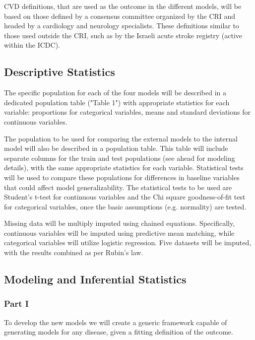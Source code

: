 \documentclass[a4paper,12pt]{article}
\begin{document}
	CVD definitions, that are used as the outcome in the different models, will be based on those defined by a consensus committee organized by the CRI and headed by a cardiology and neurology specialists. These definitions similar to those used outside the CRI, such as by the Israeli acute stroke registry\cite{ICDC2017} (active within the ICDC).
	
	
	\subsection{Descriptive Statistics}
	The specific population for each of the four models will be described in a dedicated population table ("Table 1") with appropriate statistics for each variable: proportions for categorical variables, means and standard deviations for continuous variables.
	
	The population to be used for comparing the external models to the internal model will also be described in a population table. This table will include separate columns for the train and test populations (see ahead for modeling details), with the same appropriate statistics for each variable. Statistical tests will be used to compare these populations for differences in baseline variables that could affect model generalizability. The statistical tests to be used are Student's t-test for continuous variables and the Chi square goodness-of-fit test for categorical variables, once the basic assumptions (e.g. normality) are tested.
	
	Missing data will be multiply imputed using chained equations. Specifically, continuous variables will be imputed using predictive mean matching, while categorical variables will utilize logistic regression\cite{Buuren2011}. Five datasets will be imputed, with the results combined as per Rubin's law\cite{Rubin1987}.
	
	\subsection{Modeling and Inferential Statistics}
	
		\subsubsection{Part I}
		
		To develop the new models we will create a generic framework capable of generating models for any disease, given a fitting definition of the outcome.
		
\end{document}
